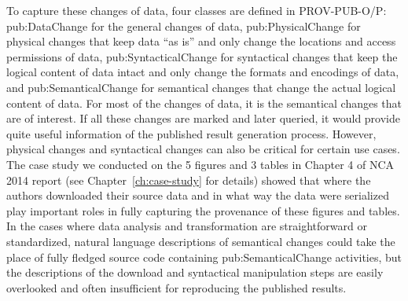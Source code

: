 To capture these changes of data, four classes are defined in PROV-PUB-O/P: pub:DataChange for the general changes of data, pub:PhysicalChange for physical changes that keep data ``as is'' and only change the locations and access permissions of data, pub:SyntacticalChange for syntactical changes that keep the logical content of data intact and only change the formats and encodings of data, and pub:SemanticalChange for semantical changes that change the actual logical content of data. For most of the changes of data, it is the semantical changes that are of interest. If all these changes are marked and later queried, it would provide quite useful information of the published result generation process. However, physical changes and syntactical changes can also be critical for certain use cases. The case study we conducted on the 5 figures and 3 tables in Chapter 4 of NCA 2014 report (see Chapter~\ref{ch:case-study} for details) showed that where the authors downloaded their source data and in what way the data were serialized play important roles in fully capturing the provenance of these figures and tables. In the cases where data analysis and transformation are straightforward or standardized, natural language descriptions of semantical changes could take the place of fully fledged source code containing pub:SemanticalChange activities, but the descriptions of the download and syntactical manipulation steps are easily overlooked and often insufficient for reproducing the published results. 


